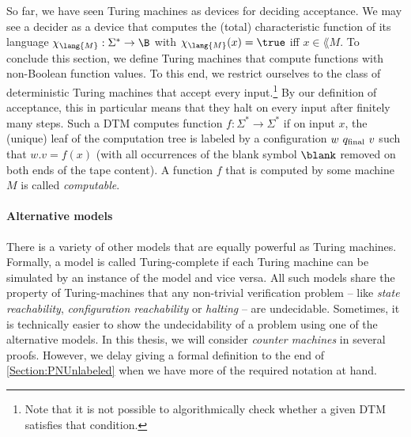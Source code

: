 \documentclass[../../diss.tex]{subfiles}
\begin{document}
So far, we have seen Turing machines as devices for deciding acceptance.
We may see a decider as a device that computes the (total) characteristic function of its language $\chi_{\lang{M}} : \Sigma^* \to \B$ with $\chi_{\lang{M}} (x) = \true$ iff $x \in \lang{M}$.
To conclude this section, we define Turing machines that compute functions with non-Boolean function values.
To this end, we restrict ourselves to the class of deterministic Turing machines that accept every input.\footnote{
    Note that it is not possible to algorithmically check whether a given DTM satisfies that condition.
}
By our definition of acceptance, this in particular means that they halt on every input after finitely many steps.
Such a DTM computes function $f \colon \Sigma^* \to \Sigma^*$ if on input $x$, the (unique) leaf of the computation tree is labeled by a configuration $w \ q_{\text{final}} \ v$ such that $w.v = f(x)$ (with all occurrences of the blank symbol $\blank$ removed on both ends of the tape content).
A function $f$ that is computed by some machine $M$ is called \emph{computable}.

\paragraph{Alternative models}

There is a variety of other models that are equally powerful as Turing machines.
Formally, a model is called Turing-complete if each Turing machine can be simulated by an instance of the model and vice versa.
All such models share the property of Turing-machines that any non-trivial verification problem -- like \emph{state reachability}, \emph{configuration reachability} or \emph{halting} -- are undecidable.
Sometimes, it is technically easier to show the undecidability of a problem using one of the alternative models.
In this thesis, we will consider \emph{counter machines} in several proofs.
However, we delay giving a formal definition to the end of \cref{Section:PNUnlabeled} when we have more of the required notation at hand.
\end{document}
